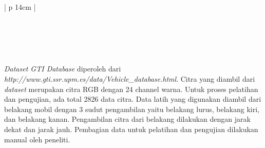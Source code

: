 \begin{table}[H]
	\small
	\begin{adjustbox}{width=1\textwidth}
		\begin{tabular}{| p {14cm} |}
			\hline
			\begin{figure}[H]
				\centering
				 \\
				\\
			\end{figure} \\
			\hline
		\end{tabular}
	\end{adjustbox}
	\label{fig:ContohUIUC}
\end{table}

\textit{Dataset GTI Database} diperoleh dari \textit{http://www.gti.ssr.upm.es/data/Vehicle\_database.html}. Citra yang diambil dari \textit{dataset} merupakan citra RGB dengan 24 channel warna. Untuk proses pelatihan dan pengujian, ada total 2826 data citra. Data latih yang digunakan diambil dari belakang mobil dengan 3 sudut pengambilan yaitu belakang lurus, belakang kiri, dan belakang kanan. Pengambilan citra dari belakang dilakukan dengan jarak dekat dan jarak jauh. Pembagian data untuk pelatihan dan pengujian dilakukan manual oleh peneliti.

